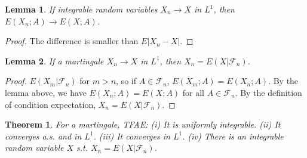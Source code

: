 \documentclass{article}
\newtheorem{Thm}{Theorem}[section]
\newtheorem{Lem}{Lemma}[section]
\theoremstyle{definition}
\begin{document}
\begin{Lem}
If integrable random variables $X_n\to X$ in $L^1$, then $E(X_n;A)\to E(X;A)$.
\end{Lem}
\begin{proof}
The difference is smaller than $E\left|X_n-X\right|$.
\end{proof}
\begin{Lem}
If a martingale $X_n\to X$ in $L^1$, then $X_n=E(X|\mathcal{F}_n)$.
\end{Lem}
\begin{proof}
$E(X_m|\mathcal{F}_n)$ for $m>n$, so if $A\in\mathcal{F}_n$, $E(X_m;A)=E(X_n;A)$. By the lemma above, we have $E(X_n;A)=E(X;A)$ for all $A\in\mathcal{F}_n$. By the definition of condition expectation, $X_n=E(X|\mathcal{F}_n)$.
\end{proof}
\begin{Thm}
    For a martingale, TFAE:\newline
    (i) It is uniformly integrable.\newline 
    (ii) It converges a.s. and in $L^1$.\newline 
    (iii) It converges in $L^1$.\newline 
    (iv) There is an integrable random variable $X$ s.t. $X_n=E(X|\mathcal{F}_n)$.
\end{Thm}
\end{document}
